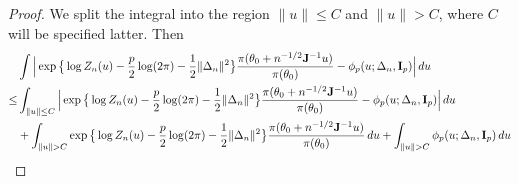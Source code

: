 \documentclass[3p]{elsarticle}
\theoremstyle{plain}
\theoremstyle{definition}
\theoremstyle{remark}
\begin{document}
\begin{proof}
We split the integral into the region $\|u\|\leq C$ and $\|u\|>C$, where $C$ will be specified latter.
Then
\begin{equation}\label{eq:threeTerms}
\begin{aligned}
    &\int \Big|
\exp\big\{\log Z_n(u) -\frac{p}{2}\log (2\pi)-\frac{1}{2}\|\Delta_n\|^2\big\}
\frac{\pi(\theta_0+n^{-1/2} \BJ^{-1}u)}{\pi(\theta_0)}
        -
        \phi_p(u;\Delta_n,\BI_p)
        \Big| \, du
        \\
        \leq &
    \int_{\|u\|\leq C} \Big|
\exp\big\{\log Z_n(u) -\frac{p}{2}\log (2\pi)-\frac{1}{2}\|\Delta_n\|^2\big\}
\frac{\pi(\theta_0+n^{-1/2} \BJ^{-1}u)}{\pi(\theta_0)}
        -
        \phi_p(u;\Delta_n,\BI_p)
        \Big| \, du
        \\
        &+ 
    \int_{\|u\|> C}
\exp\big\{\log Z_n(u) -\frac{p}{2}\log (2\pi)-\frac{1}{2}\|\Delta_n\|^2\big\}
\frac{\pi(\theta_0+n^{-1/2} \BJ^{-1}u)}{\pi(\theta_0)}\, du
        +\int_{\|u\|>C} \phi_p(u;\Delta_n,\BI_p) \, du
        \\
\end{aligned}
\end{equation}


\end{proof}
\end{document}
